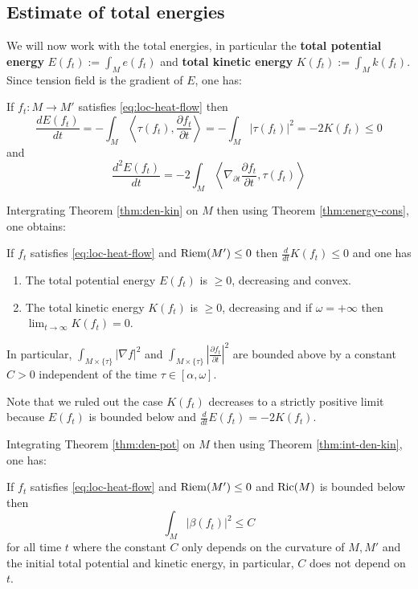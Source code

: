 \subsection{Estimate of total energies}
\label{sec:orge212cfb}

We will now work with the total energies, in particular the \textbf{total potential energy} \(E(f_t) := \int_M e(f_t)\) and \textbf{total kinetic energy} \(K(f_t) := \int_M k(f_t)\). Since
tension field is the gradient of \(E\), one has:

\begin{theorem}
\label{thm:energy-cons}
If \(f_t: M \longrightarrow  M'\) satisfies \eqref{eq:loc-heat-flow} then
\[
 \frac{d E(f_t)}{dt} = -\int_M \left\langle \tau(f_t), \frac{\partial f_t}{\partial t}
\right \rangle = -\int_M |\tau(f_t)|^2 = -2K(f_t) \leq 0
\]
and
\[
\frac{d^2 E(f_t)}{dt} = -2\int_M \left \langle \nabla_{\partial t}\frac{\partial
f_t}{\partial t},\tau(f_t)\right \rangle
\]
\end{theorem}

Intergrating Theorem \ref{thm:den-kin} on \(M\) then using Theorem \ref{thm:energy-cons}, one obtains:

\begin{theorem}
\label{thm:int-den-kin}
If \(f_t\) satisfies \eqref{eq:loc-heat-flow} and \(\mathop{\rm Riem}\nolimits(M')\leq 0\) then \(\frac{d
}{dt}K(f_t) \leq 0\) and one has
\begin{enumerate}
\item The total potential energy \(E(f_t)\) is \(\geq 0\), decreasing and convex.
\item The total kinetic energy \(K(f_t)\) is \(\geq 0\), decreasing and if \(\omega =
   +\infty\) then \(\lim_{t\to\infty} K(f_t) = 0\).
\end{enumerate}
In particular, \(\int_{M\times \{\tau\}} |\nabla f|^2\) and \(\int_{M\times\{\tau\}} \left|
\frac{\partial f_t}{\partial t} \right|^2\) are bounded above by a constant \(C>0\)
independent of the time \(\tau \in[\alpha,\omega]\).
\end{theorem}
Note that we ruled out the case \(K(f_t)\) decreases to a strictly positive limit
because \(E(f_t)\) is bounded below and \(\frac{d }{d t} E(f_t) = -2K(f_t)\).


Integrating Theorem \ref{thm:den-pot} on \(M\) then using Theorem \ref{thm:int-den-kin}, one has:

\begin{theorem}
\label{thm:int-den-pot}
If \(f_t\) satisfies \eqref{eq:loc-heat-flow} and \(\mathop{\rm Riem}\nolimits(M')\leq 0\) and \(\mathop{\rm Ric}\nolimits(M)\)
is bounded below then 
\[
\int_M |\beta(f_t)|^2 \leq C
\]
for all time \(t\) where the constant \(C\) only depends on the curvature of \(M, M'\) and the initial total potential and kinetic energy, in particular, \(C\) does not depend on \(t\).
\end{theorem}

